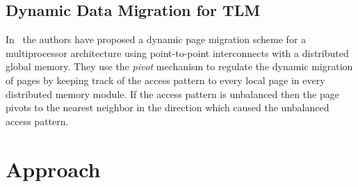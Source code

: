 \documentclass{listhesis}
\begin{document}
\section{Dynamic Data Migration for TLM}
In~\cite{dynamicPageMigration} the authors have proposed a dynamic page migration scheme for a multiprocessor architecture using point-to-point interconnects with a distributed global memory. They use the \textit{pivot} mechanism to regulate the dynamic migration of pages by keeping track of the access pattern to every local page in every distributed memory module. If the access pattern is unbalanced then the page pivots to the nearest neighbor in the direction which caused the unbalanced access pattern.  

\chapter{Approach}
\end{document}
